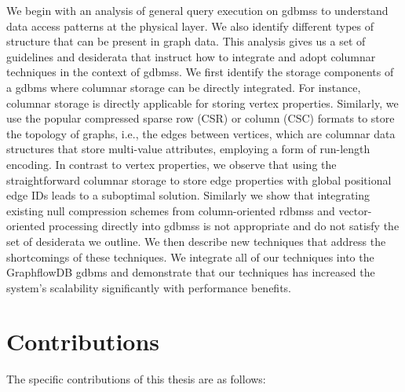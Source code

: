 We begin with an analysis of general query execution on \gls{gdbms}s to understand data access patterns at the physical layer. We also identify different types of structure that can be present in graph data. This analysis gives us a set of guidelines and desiderata that instruct how to integrate and adopt columnar techniques in the context of \gls{gdbms}s. We first identify the storage components of a \gls{gdbms} where columnar storage can be directly integrated. For instance, columnar storage is directly applicable for storing vertex properties. Similarly, we use the popular compressed sparse row (CSR) or column (CSC) formats to store the topology of graphs, i.e., the edges between vertices, which are columnar data structures that store multi-value attributes, employing a form of run-length encoding. In contrast to vertex properties, we observe that using the straightforward columnar storage to store edge properties with global positional edge IDs leads to a suboptimal solution. Similarly we show that integrating existing null compression schemes from column-oriented \gls{rdbms}s and vector-oriented processing directly into \gls{gdbms}s is not appropriate and do not satisfy the set of desiderata we outline. We then describe new techniques that address the shortcomings of these techniques. We integrate all of our techniques into the GraphflowDB \gls{gdbms} and demonstrate that our techniques has increased the system's scalability significantly with performance benefits.

\section{Contributions}

The specific contributions of this thesis are as follows:

